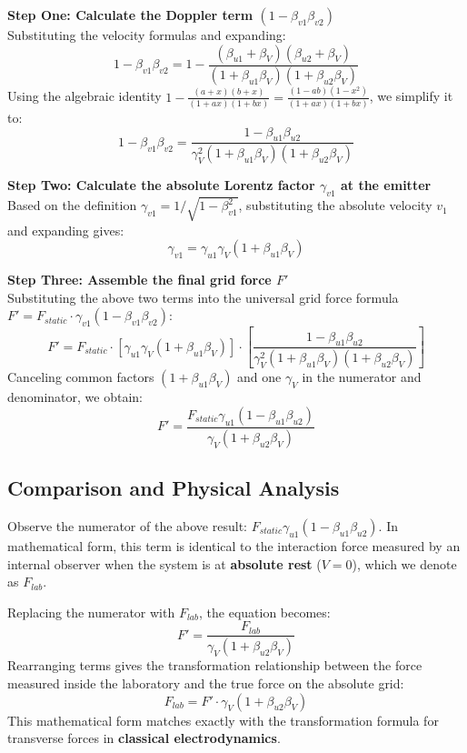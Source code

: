 \documentclass[12pt, a4paper]{article}
\begin{document}
\textbf{Step One: Calculate the Doppler term $(1 - \beta_{v1}\beta_{v2})$} \\
Substituting the velocity formulas and expanding:
\[
1 - \beta_{v1}\beta_{v2} = 1 - \frac{(\beta_{u1} + \beta_V)(\beta_{u2} + \beta_V)}{(1 + \beta_{u1}\beta_V)(1 + \beta_{u2}\beta_V)}
\]
Using the algebraic identity $1 - \frac{(a+x)(b+x)}{(1+ax)(1+bx)} = \frac{(1-ab)(1-x^2)}{(1+ax)(1+bx)}$, we simplify it to:
\[
1 - \beta_{v1}\beta_{v2} = \frac{1 - \beta_{u1}\beta_{u2}}{\gamma_V^2 (1 + \beta_{u1}\beta_V)(1 + \beta_{u2}\beta_V)}
\]

\textbf{Step Two: Calculate the absolute Lorentz factor $\gamma_{v1}$ at the emitter} \\
Based on the definition $\gamma_{v1} = 1/\sqrt{1-\beta_{v1}^2}$, substituting the absolute velocity $v_1$ and expanding gives:
\[
\gamma_{v1} = \gamma_{u1} \gamma_V (1 + \beta_{u1}\beta_V)
\]

\textbf{Step Three: Assemble the final grid force $F'$} \\
Substituting the above two terms into the universal grid force formula $F' = F_{static} \cdot \gamma_{v1} (1 - \beta_{v1}\beta_{v2})$:
\[
F' = F_{static} \cdot \left[ \gamma_{u1} \gamma_V (1 + \beta_{u1}\beta_V) \right] \cdot \left[ \frac{1 - \beta_{u1}\beta_{u2}}{\gamma_V^2 (1 + \beta_{u1}\beta_V)(1 + \beta_{u2}\beta_V)} \right]
\]
Canceling common factors $(1 + \beta_{u1}\beta_V)$ and one $\gamma_V$ in the numerator and denominator, we obtain:
\[
F' = \frac{F_{static} \gamma_{u1} (1 - \beta_{u1}\beta_{u2})}{\gamma_V (1 + \beta_{u2}\beta_V)}
\]

\subsection{Comparison and Physical Analysis}

Observe the numerator of the above result: $F_{static} \gamma_{u1} (1 - \beta_{u1}\beta_{u2})$. In mathematical form, this term is identical to the interaction force measured by an internal observer when the system is at \textbf{absolute rest} ($V=0$), which we denote as $F_{lab}$.

Replacing the numerator with $F_{lab}$, the equation becomes:
\[
F' = \frac{F_{lab}}{\gamma_V (1 + \beta_{u2}\beta_V)}
\]
Rearranging terms gives the transformation relationship between the force measured inside the laboratory and the true force on the absolute grid:
\[
F_{lab} = F' \cdot \gamma_V (1 + \beta_{u2}\beta_V)
\]
This mathematical form matches exactly with the transformation formula for transverse forces in \textbf{classical electrodynamics}.
\end{document}

